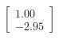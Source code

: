 \documentclass[preview]{standalone}
\begin{document}
\begin{align*}
\begin{bmatrix} 1.00 \\ -2.95 \end{bmatrix}
\end{align*}
\end{document}
